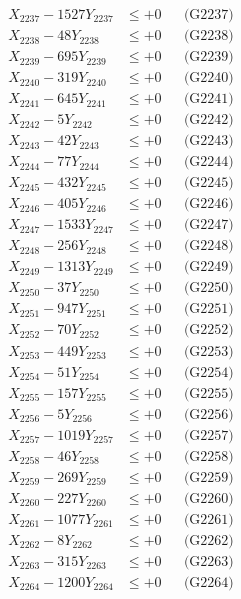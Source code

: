 \documentclass[a4paper,10pt]{article}
\begin{document}
{\begin{align}
X_{2237} - 1527Y_{2237} &\leq +0 && \text{(G2237)} \\
X_{2238} - 48Y_{2238} &\leq +0 && \text{(G2238)} \\
X_{2239} - 695Y_{2239} &\leq +0 && \text{(G2239)} \\
X_{2240} - 319Y_{2240} &\leq +0 && \text{(G2240)} \\
\allowbreak
X_{2241} - 645Y_{2241} &\leq +0 && \text{(G2241)} \\
X_{2242} - 5Y_{2242} &\leq +0 && \text{(G2242)} \\
X_{2243} - 42Y_{2243} &\leq +0 && \text{(G2243)} \\
X_{2244} - 77Y_{2244} &\leq +0 && \text{(G2244)} \\
X_{2245} - 432Y_{2245} &\leq +0 && \text{(G2245)} \\
X_{2246} - 405Y_{2246} &\leq +0 && \text{(G2246)} \\
X_{2247} - 1533Y_{2247} &\leq +0 && \text{(G2247)} \\
X_{2248} - 256Y_{2248} &\leq +0 && \text{(G2248)} \\
X_{2249} - 1313Y_{2249} &\leq +0 && \text{(G2249)} \\
X_{2250} - 37Y_{2250} &\leq +0 && \text{(G2250)} \\
\allowbreak
X_{2251} - 947Y_{2251} &\leq +0 && \text{(G2251)} \\
X_{2252} - 70Y_{2252} &\leq +0 && \text{(G2252)} \\
X_{2253} - 449Y_{2253} &\leq +0 && \text{(G2253)} \\
X_{2254} - 51Y_{2254} &\leq +0 && \text{(G2254)} \\
X_{2255} - 157Y_{2255} &\leq +0 && \text{(G2255)} \\
X_{2256} - 5Y_{2256} &\leq +0 && \text{(G2256)} \\
X_{2257} - 1019Y_{2257} &\leq +0 && \text{(G2257)} \\
X_{2258} - 46Y_{2258} &\leq +0 && \text{(G2258)} \\
X_{2259} - 269Y_{2259} &\leq +0 && \text{(G2259)} \\
X_{2260} - 227Y_{2260} &\leq +0 && \text{(G2260)} \\
\allowbreak
X_{2261} - 1077Y_{2261} &\leq +0 && \text{(G2261)} \\
X_{2262} - 8Y_{2262} &\leq +0 && \text{(G2262)} \\
X_{2263} - 315Y_{2263} &\leq +0 && \text{(G2263)} \\
X_{2264} - 1200Y_{2264} &\leq +0 && \text{(G2264)} \\

\end{align}}
\end{document}
